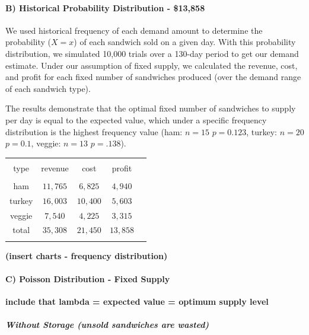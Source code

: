 \documentclass[]{article}
\begin{document}
\paragraph{B) Historical Probability Distribution -
\$13,858}\label{b-historical-probability-distribution---13858}

We used historical frequency of each demand amount to determine the
probability ($X=x$) of each sandwich sold on a given day. With this
probability distribution, we simulated 10,000 trials over a 130-day
period to get our demand estimate. Under our assumption of fixed supply,
we calculated the revenue, cost, and profit for each fixed number of
sandwiches produced (over the demand range of each sandwich type).

The results demonstrate that the optimal fixed number of sandwiches to
supply per day is equal to the expected value, which under a specific
frequency distribution is the highest frequency value (ham: $n=15$
$p=0.123$, turkey: $n=20$ $p=0.1$, veggie: $n=13$ $p=.138$).

\begin{table}[!htbp]
  \label{} 
\begin{tabular}{@{\extracolsep{5pt}} ccccc} 
\\[-1.8ex]\hline 
\hline \\[-1.8ex] 
type & revenue & cost & profit \\ 
\hline \\[-1.8ex] 
ham & $11,765$ & $6,825$ & $4,940$ \\ 
turkey & $16,003$ & $10,400$ & $5,603$ \\ 
veggie & $7,540$ & $4,225$ & $3,315$ \\ 
total & $35,308$ & $21,450$ & $13,858$ \\ 
\hline \\[-1.8ex] 
\end{tabular} 
\end{table}

\textbf{(insert charts - frequency distribution)}

\paragraph{C) Poisson Distribution - Fixed
Supply}\label{c-poisson-distribution---fixed-supply}

\textbf{include that lambda = expected value = optimum supply level}

\subparagraph{Without Storage (unsold sandwiches are
wasted)}\label{without-storage-unsold-sandwiches-are-wasted}
\end{document}

